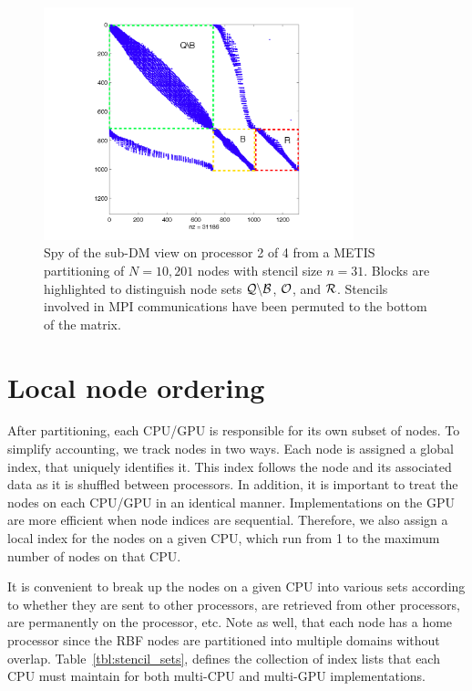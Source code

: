 \documentclass{report}
\begin{document}
\begin{figure}[ht!]
\begin{center}
\includegraphics[width=9cm]{rbffd_methods_content/decompositions/spy_metis_stencil_example_labels.png}
\caption{Spy of the sub-DM view on processor 2 of 4 from a METIS partitioning of $N=10,201$ nodes with stencil size $n=31$. Blocks are highlighted to distinguish node sets $\mathcal{Q} \backslash \mathcal{B}$, $\mathcal{O}$, and $\mathcal{R}$. Stencils involved in MPI communications have been permuted to the bottom of the matrix.}
\label{fig:decomp_spy}
\end{center}
\end{figure}


\section{Local node ordering}

After partitioning, each CPU/GPU is responsible for its own subset of nodes. 
To simplify accounting, we track nodes in two ways. Each node is assigned
a global index, that uniquely identifies it. This index follows the node 
and its associated data as it is shuffled between processors. In addition, 
it is important to treat the nodes on each CPU/GPU in an identical manner. 
Implementations on the GPU are more efficient when node indices
are sequential. Therefore, we also assign a local index for the nodes on 
a given CPU, which run from 1 to the maximum number of nodes on that CPU. 

It is convenient to break up the nodes on a given CPU into various sets
according to whether they are sent to other processors, are retrieved from 
other processors, are permanently on the processor, etc. Note as well, 
that each node has a home processor since the RBF nodes are partitioned into 
multiple domains without overlap.
Table~\ref{tbl:stencil_sets}, defines the collection of index lists that each CPU must maintain for both multi-CPU and multi-GPU implementations.  
\end{document}
